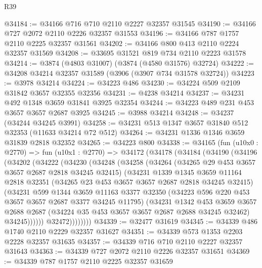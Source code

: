 \begin{lexlean}{R39}
\begin{coremodule}
@34184 := @34166 @716 @710 @2110 @2227 @32357 @31545
@34190 := @34166 @727 @2072 @2110 @2226 @32357 @31553
@34196 := @34166 @787 @1757 @2110 @2225 @32357 @31561
@34202 := @34166 @800 @413 @2110 @2224 @32357 @31569
@34208 := @33695 @31521 @819 @734 @2110 @2223 @31578
@34214 := @3874 (@4803 @31007) (@3874 (@4580 @31576) @32724)
@34222 := @34208 @34214 @32357 @31589 (@3906 (@3907 @734 @31578 @32724))
@34223 := @3978 @34214
@34224 := @34223 @486
@34230 := @34224 @509 @2109 @31842 @3657 @32355 @32356
@34231 := @4238 @34214
@34237 := @34231 @492 @1348 @3659 @31841 @3925 @32354
@34244 := @34223 @489 @231 @453 @3657 @3657 @2687 @3925
@34245 := @3988 @34214
@34248 := @34237 (@34244 @34245 @3991)
@34258 := @34231 @513 @1347 @3657 @31840 @512 @32353 (@11633 @34214 @72 @512)
@34264 := @34231 @1336 @1346 @3659 @31839 @2818 @32352
@34265 := @34223 @800
@34338 := @34165
    (fun (u10x0 : @2770) =>
    fun (u10x1 : @2770) =>
    @34172
      (@34178
        (@34184
          (@34190
            (@34196
              (@34202
                (@34222
                  (@34230
                    (@34248
                      (@34258
                        (@34264
                          (@34265 @29 @453 @3657 @3657 @2687 @2818 @34245 @32415)
                          (@34231
                            @1339
                            @1345
                            @3659
                            @11164
                            @2818
                            @32351
                            (@34265 @23 @453 @3657 @3657 @2687 @2818 @34245 @32415)
                            (@34231
                              @599
                              @1344
                              @3659
                              @11163
                              @3377
                              @32350
                              (@34223 @596 @220 @453 @3657 @3657 @2687 @3377 @34245 @11795)
                              (@34231
                                @1342
                                @453
                                @3659
                                @3657
                                @2688
                                @2687
                                (@34224 @35 @453 @3657 @3657 @2687 @2688 @34245 @32462)
                                @34245))))))
                    @32472))))))))
@34339 := @32477 @31619
@34345 := @34339 @486 @1740 @2110 @2229 @32357 @31627
@34351 := @34339 @573 @1353 @2203 @2228 @32357 @31635
@34357 := @34339 @716 @710 @2110 @2227 @32357 @31643
@34363 := @34339 @727 @2072 @2110 @2226 @32357 @31651
@34369 := @34339 @787 @1757 @2110 @2225 @32357 @31659

\end{coremodule}
\end{lexlean}

